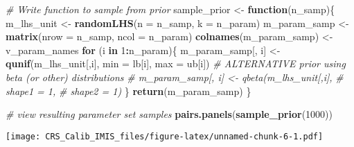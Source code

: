 \documentclass[
]{article}
\newenvironment{Shaded}{\begin{snugshade}}{\end{snugshade}}
\newcommand{\CommentTok}[1]{\textcolor[rgb]{0.56,0.35,0.01}{\textit{#1}}}
\newcommand{\ControlFlowTok}[1]{\textcolor[rgb]{0.13,0.29,0.53}{\textbf{#1}}}
\newcommand{\DataTypeTok}[1]{\textcolor[rgb]{0.13,0.29,0.53}{#1}}
\newcommand{\DecValTok}[1]{\textcolor[rgb]{0.00,0.00,0.81}{#1}}
\newcommand{\KeywordTok}[1]{\textcolor[rgb]{0.13,0.29,0.53}{\textbf{#1}}}
\newcommand{\NormalTok}[1]{#1}
\newcommand{\OperatorTok}[1]{\textcolor[rgb]{0.81,0.36,0.00}{\textbf{#1}}}
\newcommand{\StringTok}[1]{\textcolor[rgb]{0.31,0.60,0.02}{#1}}
\begin{document}
\begin{Shaded}
\begin{Highlighting}[]
\CommentTok{#  Write function to sample from prior}
\NormalTok{sample_prior <-}\StringTok{ }\ControlFlowTok{function}\NormalTok{(n_samp)\{}
\NormalTok{  m_lhs_unit   <-}\StringTok{ }\KeywordTok{randomLHS}\NormalTok{(}\DataTypeTok{n =}\NormalTok{ n_samp, }\DataTypeTok{k =}\NormalTok{ n_param)}
\NormalTok{  m_param_samp <-}\StringTok{ }\KeywordTok{matrix}\NormalTok{(}\DataTypeTok{nrow =}\NormalTok{ n_samp, }\DataTypeTok{ncol =}\NormalTok{ n_param)}
  \KeywordTok{colnames}\NormalTok{(m_param_samp) <-}\StringTok{ }\NormalTok{v_param_names}
  \ControlFlowTok{for}\NormalTok{ (i }\ControlFlowTok{in} \DecValTok{1}\OperatorTok{:}\NormalTok{n_param)\{}
\NormalTok{    m_param_samp[, i] <-}\StringTok{ }\KeywordTok{qunif}\NormalTok{(m_lhs_unit[,i],}
                               \DataTypeTok{min =}\NormalTok{ lb[i],}
                               \DataTypeTok{max =}\NormalTok{ ub[i])}
    \CommentTok{# ALTERNATIVE prior using beta (or other) distributions}
    \CommentTok{# m_param_samp[, i] <- qbeta(m_lhs_unit[,i],}
    \CommentTok{#                            shape1 = 1,}
    \CommentTok{#                            shape2 = 1)}
\NormalTok{  \}}
  \KeywordTok{return}\NormalTok{(m_param_samp)}
\NormalTok{\}}

\CommentTok{# view resulting parameter set samples}
\KeywordTok{pairs.panels}\NormalTok{(}\KeywordTok{sample_prior}\NormalTok{(}\DecValTok{1000}\NormalTok{))}
\end{Highlighting}
\end{Shaded}

\texttt{[image: CRS\_Calib\_IMIS\_files/figure-latex/unnamed-chunk-6-1.pdf]}
\end{document}

